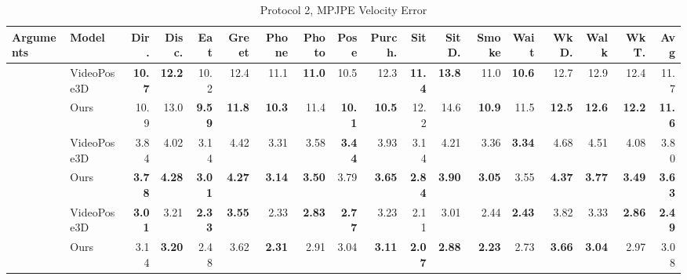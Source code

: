 \documentclass[10pt,twocolumn,letterpaper]{article}
\begin{document}
\begin{center}
\begin{table}
\small
\setlength\tabcolsep{2.3pt}
\begin{tabular}{l|l|rrrrrrrrrrrrrrrr} 
Arguments & Model & Dir. & Disc. & Eat & Greet & Phone & Photo & Pose & Purch. & Sit & SitD. & Smoke & Wait & WkD. & Walk & WkT. & \textbf{Avg} \\
\hline
 & VideoPose3D & \textbf{10.7} & \textbf{12.2} & 10.2 & 12.4 & 11.1 & \textbf{11.0} & 10.5 & 12.3 & \textbf{11.4} & \textbf{13.8} & 11.0 & \textbf{10.6} & 12.7 & 12.9 & 12.4 & 11.7  \\
 & Ours & 10.9 & 13.0 & \textbf{9.59} & \textbf{11.8} & \textbf{10.3} & 11.4 & \textbf{10.1} & \textbf{10.5} & 12.2 & 14.6 & \textbf{10.9} & 11.5 & \textbf{12.5} & \textbf{12.6} & \textbf{12.2} & \textbf{11.6} \\
\hline
 & VideoPose3D & 3.84 & 4.02 & 3.14 & 4.42 & 3.31 & 3.58 & \textbf{3.44} & 3.93 & 3.14 & 4.21 & 3.36 & \textbf{3.34} & 4.68 & 4.51 & 4.08 & 3.80 \\
 & Ours & \textbf{3.78} & \textbf{4.28} & \textbf{3.01} & \textbf{4.27} & \textbf{3.14} & \textbf{3.50} & 3.79 & \textbf{3.65} & \textbf{2.84} & \textbf{3.90} & \textbf{3.05} & 3.55 & \textbf{4.37} & \textbf{3.77} & \textbf{3.49} & \textbf{3.63}\\
\hline

 & VideoPose3D & \textbf{3.01} & 3.21 & \textbf{2.33} & \textbf{3.55} & 2.33 & \textbf{2.83} & \textbf{2.77} & 3.23 & 2.11 & 3.01 & 2.44 & \textbf{2.43} & 3.82 & 3.33 & \textbf{2.86} & \textbf{2.49} \\
 & Ours & 3.14 & \textbf{3.20} & 2.48 & 3.62 & \textbf{2.31} & 2.91 & 3.04 & \textbf{3.11} & \textbf{2.07} & \textbf{2.88} & \textbf{2.23} & 2.73 & \textbf{3.66} & \textbf{3.04} & 2.97 & 3.08 \\

 
\hline

\hline
\end{tabular}

\caption{Protocol 2, MPJPE Velocity Error}
\label{tab:V-MPJPE Error}
\end{table}
\end{center}


\end{document}
